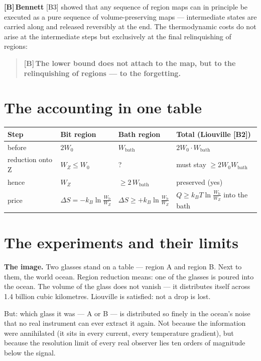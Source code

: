 \documentclass[11pt,a4paper]{article}
\newcommand{\LB}{\textcolor{layB}{\textbf{\footnotesize\textsf{[B]}}}\,}
\begin{document}
\LB \textbf{Bennett} [B3] showed that any sequence of region maps can in principle
be executed as a pure sequence of volume-preserving maps --- intermediate states
are carried along and released reversibly at the end. The thermodynamic costs do
not arise at the intermediate steps but exclusively at the final relinquishing of
regions:

\begin{quote}
\LB \textbf{The lower bound does not attach to the map, but to the relinquishing
of regions --- to the forgetting.}
\end{quote}

\section{The accounting in one table}

\begin{center}
\small
\begin{tabular}{@{}llll@{}}
\toprule
\textbf{Step} & \textbf{Bit region} & \textbf{Bath region} & \textbf{Total (Liouville [B2])} \\
\midrule
before & $2W_0$ & $W_{\text{bath}}$ & $2W_0 \cdot W_{\text{bath}}$ \\
reduction onto Z & $W_Z \le W_0$ & ? & must stay $\ge 2W_0 W_{\text{bath}}$ \\
hence & $W_Z$ & $\ge 2\,W_{\text{bath}}$ & preserved (yes) \\
price & $\Delta S = -k_B \ln\frac{W_{\text{b}}}{W_Z}$ & $\Delta S \ge +k_B \ln\frac{W_{\text{b}}}{W_Z}$ & $Q \ge k_B T \ln\frac{W_{\text{b}}}{W_Z}$ into the bath \\
\bottomrule
\end{tabular}
\end{center}

\section{The experiments and their limits}
\label{sec:experiments}

\textbf{The image.} Two glasses stand on a table --- region A and region B. Next
to them, the world ocean. Region reduction means: one of the glasses is poured
into the ocean. The volume of the glass does not vanish --- it distributes itself
across 1.4 billion cubic kilometres. Liouville is satisfied: not a drop is lost.

But: which glass it was --- A or B --- is distributed so finely in the ocean's
noise that no real instrument can ever extract it again. Not because the
information were annihilated (it sits in every current, every temperature
gradient), but because the resolution limit of every real observer lies ten orders
of magnitude below the signal.
\end{document}
